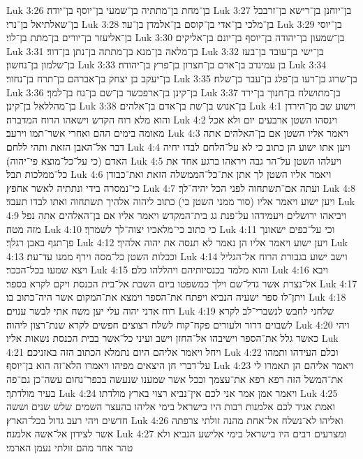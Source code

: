 Luk 3:26  בן־מחת בן־מתתיה בן־שמעי בן־יוסף בן־יודה׃
Luk 3:27  בן־יוחנן בן־רישא בן־זרבבל בן־שאלתיאל בן־נרי׃
Luk 3:28  בן־מלכי בן־אדי בן־קוסם בן־אלמדן בן־ער׃
Luk 3:29  בן־יוסי בן־אליעזר בן־יורים בן־מתת בן־לוי׃
Luk 3:30  בן־שמעון בן־יהודה בן־יוסף בן־יונם בן־אליקים׃
Luk 3:31  בן־מלאה בן־מנא בן־מתתה בן־נתן בן־דוד׃
Luk 3:32  בן־ישי בן־עובד בן־בעז בן־שלמון בן־נחשון׃
Luk 3:33  בן עמינדב בן־ארם בן־חצרון בן־פרץ בן־יהודה׃
Luk 3:34  בן־יעקב בן יצחק בן־אברהם בן־תרח בן־נחור׃
Luk 3:35  בן־שרוג בן־רעו בן־פלג בן־עבר בן־שלח׃
Luk 3:36  בן־קינן בן־ארפכשד בן־שם בן־נח בן־למך׃
Luk 3:37  בן־מתושלח בן־חנוך בן־ירד בן־מהללאל בן־קינן׃
Luk 3:38  בן־אנוש בן־שת בן־אדם בן־אלהים׃
Luk 4:1  וישוע שב מן־הירדן והוא מלא רוח הקדש וישאהו הרוח המדברה׃
Luk 4:2  וינסהו השטן ארבעים יום ולא אכל מאומה בימים ההם ואחרי אשר־תמו וירעב׃
Luk 4:3  ויאמר אליו השטן אם בן־האלהים אתה דבר אל־האבן הזאת ותהי ללחם׃
Luk 4:4  ויען אתו ישוע הן כתוב כי לא על־הלחם לבדו יחיה האדם (כי על־כל־מוצא פי־יהוה)׃
Luk 4:5  ויעלהו השטן על־הר גבה ויראהו ברגע אחד את כל־ממלכות תבל׃
Luk 4:6  ויאמר אליו השטן לך אתן את־כל־הממשלה הזאת ואת־כבודן כי־נמסרה בידי ונתתיה לאשר אחפץ׃
Luk 4:7  ועתה אם־תשתחוה לפני הכל יהיה־לך׃
Luk 4:8  ויען ישוע ויאמר אליו (סור ממני השטן כי) כתוב ליהוה אלהיך תשתחוה ואתו לבדו תעבד׃
Luk 4:9  ויביאהו ירושלים ויעמידהו על־פנת גג בית־המקדש ויאמר אליו אם בן־האלהים אתה נפל מזה מטה׃
Luk 4:10  כי כתוב כי־מלאכיו יצוה־לך לשמרך׃
Luk 4:11  וכי על־כפים ישאונך פן־תגף באבן רגלך׃
Luk 4:12  ויען ישוע ויאמר אליו הן נאמר לא תנסה את יהוה אלהיך׃
Luk 4:13  וככלות השטן כל־מסה וירף ממנו עד־עת׃
Luk 4:14  וישב ישוע בגבורת הרוח אל־הגליל ויצא שמעו בכל־הככר׃
Luk 4:15  והוא מלמד בכנסיותיהם ויהללהו כלם׃
Luk 4:16  ויבא אל־נצרת אשר גדל־שם וילך כמשפטו ביום השבת אל־בית הכנסת ויקם לקרא בספר׃
Luk 4:17  ויתן־לו ספר ישעיה הנביא ויפתח את־הספר וימצא את־המקום אשר היה־כתוב בו׃
Luk 4:18  רוח אדני יהוה עלי יען משח אתי לבשר ענוים׃
Luk 4:19  שלחני לחבש לנשברי־לב לקרא לשבוים דרור ולעורים פקח־קוח לשלח רצוצים חפשים לקרא שנת־רצון ליהוה׃
Luk 4:20  ויהי כאשר גלל את־הספר וישיבהו אל־החזן וישב ועיני כל־אשר בבית הכנסת נשאות אליו׃
Luk 4:21  ויחל ויאמר אליהם היום נתמלא הכתוב הזה באזניכם׃
Luk 4:22  וכלם העידהו ותמהו על־דברי חן היצאים מפיהו ויאמרו הלא־זה הוא בן־יוסף׃
Luk 4:23  ויאמר אליהם הן תאמרו לי את־המשל הזה רפא רפא את־עצמך וככל אשר שמענו שנעשה בכפר־נחום עשה־כן גם־פה בעיר מולדתך׃
Luk 4:24  ויאמר אמן אמר אני לכם אין־נביא רצוי בארץ מולדתו׃
Luk 4:25  ואמת אגיד לכם אלמנות רבות היו בישראל בימי אליהו בהעצר השמים שלש שנים וששה חדשים ויהי רעב גדול בכל־הארץ׃
Luk 4:26  ואליהו לא־נשלח אל־אחת מהנה זולתי צרפתה אשר לצידון אל־אשה אלמנה׃
Luk 4:27  ומצרעים רבים היו בישראל בימי אלישע הנביא ולא טהר אחד מהם זולתי נעמן הארמי׃
